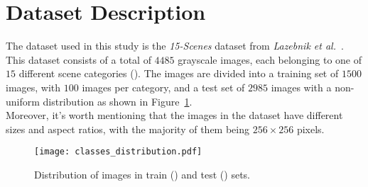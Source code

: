 \documentclass[../main.tex]{subfiles}
\begin{document}
\section{Dataset Description}\label{sec:dataset-description}

The dataset used in this study is the \textit{15-Scenes} dataset from
\textit{Lazebnik et al.}~\cite{lazebnik}.
This dataset consists of a total of $4485$ grayscale images, each belonging to
one of $15$ different scene categories
(). 
The images are divided into a training set of $1500$ images, with $100$ images
per category, and a test set of $2985$ images with a non-uniform distribution as
shown in Figure~\ref{fig:dataset-distribution}.\\
Moreover, it's worth mentioning that the images in the dataset have different sizes and aspect ratios, with the majority of them being $256 \times 256$ pixels. 

\begin{figure}[H]
  \centering
  \texttt{[image: classes\_distribution.pdf]}
  \caption{Distribution of images in train () and test () sets.}
  \label{fig:dataset-distribution}
\end{figure}
\end{document}
